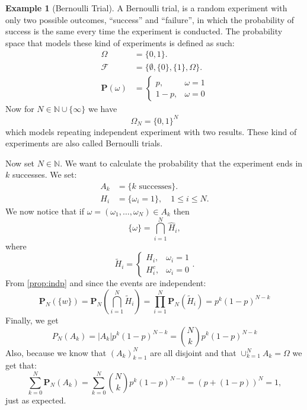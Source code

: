\documentclass[11pt,a4paper]{article}
\theoremstyle{definition}
\newtheorem{example}{Example}[section]
\theoremstyle{plain}
\newcommand{\N}{\mathbb{N}}
\newcommand{\abs}[1]{\left\lvert #1\right\rvert}
\begin{document}
  \begin{example}[Bernoulli Trial]
    A Bernoulli trial, is a random experiment with only two possible outcomes,
    ``success'' and ``failure'', in which the probability of success is the 
    same every time the experiment is conducted. The probability space that
    models these kind of experiments is defined as such:
    \begin{align*}
      \Omega &= \{0, 1\}. \\
      \mathcal F &= \{\emptyset, \{0\}, \{1\}, \Omega\}. \\
      \mathbf P(\omega) &=
      \begin{cases}
        p, &\omega = 1 \\
        1-p, &\omega= 0
      \end{cases}
    \end{align*}
    Now for $N \in \N \cup \{\infty\}$ we have
    \[ \Omega_N = \{0, 1\}^N \]
    which models repeating independent experiment with two results.
    These kind of experiments are also called Bernoulli trials.

    Now set $N \in \N$. We want to calculate the probability that the
    experiment ends in $k$ successes. We set:
    \begin{align*}
      A_k &= \{\text{$k$ successes}\}. \\
      H_i &= \{\omega_i = 1\}, \quad 1 \le i \le N.
    \end{align*}
    We now notice that if $\omega = (\omega_1,\dots,\omega_N) \in A_k$ then
    \[
      \{\omega\} = \bigcap_{i=1}^{N} \widehat{H}_i,
    \]
    where
    \[
      \widetilde{H}_{i} = 
      \begin{cases}
        H_{i}, &\omega_{i} = 1 \\ 
        H_{i}^{c}, &\omega_{i} = 0
      \end{cases}.
    \]
    From \autoref{prop:indp} and since the events are independent:
    \[
      \mathbf P_N\left(\{w\}\right) =
      \mathbf P_N\left(\bigcap_{i=1}^{N} \widetilde{H}_i \right) = 
      \prod_{i=1}^{N} \mathbf P_N(\widetilde{H}_i) =
      p^k (1-p)^{N-k}
    \]
    Finally, we get
    \[
      P_N(A_k) = 
      \abs{A_k} p^k (1-p)^{N-k} = 
      \binom{N}{k} p^k (1-p)^{N-k}
    \]
    Also, because we know that $(A_k)_{k=1}^{N}$ are all disjoint and that
    $\cup_{k=1}^{N} A_k = \Omega$ we get that:
    \[
      \sum_{k=0}^{N}\mathbf{P}_{N}\left(A_{k}\right) = 
      \sum_{k=0}^{N}{\binom{N}{k}}p^{k}\left(1-p\right)^{N-k} = 
      \left(p+\left(1-p\right)\right)^{N} = 1,
    \]
    just as expected.
  \end{example}
\end{document}
